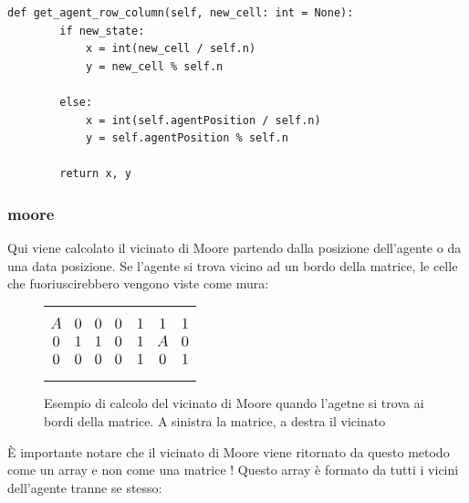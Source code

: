 \begin{lstlisting}[style=python, caption={Metodo che converte identificativo a corrdinate}]
	def get_agent_row_column(self, new_cell: int = None):
		if new_state:
			x = int(new_cell / self.n)
			y = new_cell % self.n
			
		else:
			x = int(self.agentPosition / self.n)
			y = self.agentPosition % self.n
	
		return x, y
\end{lstlisting}

\subsubsection{moore}
Qui viene calcolato il vicinato di Moore partendo dalla posizione dell'agente o da una data posizione.
Se l'agente si trova vicino ad un bordo della matrice, le celle che fuoriuscirebbero vengono viste come mura:
\begin{figure}[H]
	\begin{tabular}{m{20em} m{20em}}
		\begin{equation*}
			\large
			\begin{matrix}
				A & 0 & 0 & 0\\
				0 & 1 & 1 & 0\\
				0 & 0 & 0  & 0\\
			\end{matrix}
		\end{equation*}
		&
		\begin{equation*}
			\large
			\begin{matrix}
				1 & 1 & 1\\
				1 & A & 0\\
				1 & 0 & 1\\
			\end{matrix}
		\end{equation*}
	\end{tabular}
	\caption{Esempio di calcolo del vicinato di Moore quando l'agetne si trova ai bordi della matrice. A sinistra la matrice, a destra il vicinato}
\end{figure}

\`{E} importante notare che il vicinato di Moore viene ritornato da questo metodo come un array e non come una matrice ! Questo array \`{e} formato da tutti i vicini dell'agente tranne se stesso:

